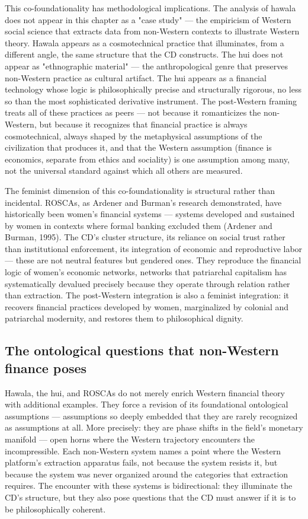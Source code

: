 This co-foundationality has methodological implications. The analysis of hawala does not appear in this chapter as a "case study" — the empiricism of Western social science that extracts data from non-Western contexts to illustrate Western theory. Hawala appears as a cosmotechnical practice that illuminates, from a different angle, the same structure that the CD constructs. The hui does not appear as "ethnographic material" — the anthropological genre that preserves non-Western practice as cultural artifact. The hui appears as a financial technology whose logic is philosophically precise and structurally rigorous, no less so than the most sophisticated derivative instrument. The post-Western framing treats all of these practices as peers — not because it romanticizes the non-Western, but because it recognizes that financial practice is always cosmotechnical, always shaped by the metaphysical assumptions of the civilization that produces it, and that the Western assumption (finance is economics, separate from ethics and sociality) is one assumption among many, not the universal standard against which all others are measured.

The feminist dimension of this co-foundationality is structural rather than incidental. ROSCAs, as Ardener and Burman's research demonstrated, have historically been women's financial systems — systems developed and sustained by women in contexts where formal banking excluded them (Ardener and Burman, 1995). The CD's cluster structure, its reliance on social trust rather than institutional enforcement, its integration of economic and reproductive labor — these are not neutral features but gendered ones. They reproduce the financial logic of women's economic networks, networks that patriarchal capitalism has systematically devalued precisely because they operate through relation rather than extraction. The post-Western integration is also a feminist integration: it recovers financial practices developed by women, marginalized by colonial and patriarchal modernity, and restores them to philosophical dignity.

\subsection{The ontological questions that non-Western finance poses}

Hawala, the hui, and ROSCAs do not merely enrich Western financial theory with additional examples. They force a revision of its foundational ontological assumptions — assumptions so deeply embedded that they are rarely recognized as assumptions at all. More precisely: they are phase shifts in the field's monetary manifold — open horns where the Western trajectory encounters the incompressible. Each non-Western system names a point where the Western platform's extraction apparatus fails, not because the system resists it, but because the system was never organized around the categories that extraction requires. The encounter with these systems is bidirectional: they illuminate the CD's structure, but they also pose questions that the CD must answer if it is to be philosophically coherent.

